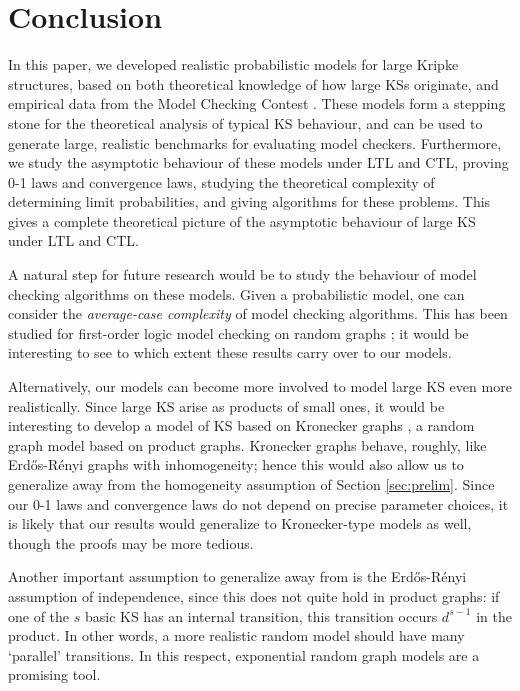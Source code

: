 \documentclass[runngingheads]{llncs}
\begin{document}
\section{Conclusion}

In this paper, we developed realistic probabilistic models for large Kripke structures, based on both theoretical knowledge of how large KSs originate, and empirical data from the Model Checking Contest \cite{amat2023behind}. These models form a stepping stone for the theoretical analysis of typical KS behaviour, and can be used to generate large, realistic benchmarks for evaluating model checkers. Furthermore, we study the asymptotic behaviour of these models under LTL and CTL, proving 0-1 laws and convergence laws, studying the theoretical complexity of determining limit probabilities, and giving algorithms for these problems. This gives a complete theoretical picture of the asymptotic behaviour of large KS under LTL and CTL.

A natural step for future research would be to study the behaviour of model checking algorithms on these models. Given a probabilistic model, one can consider the \emph{average-case complexity} of model checking algorithms. This has been studied for first-order logic model checking on random graphs \cite{dreier2020first}; it would be interesting to see to which extent these results carry over to our models.

Alternatively, our models can become more involved to model large KS even more realistically. Since large KS arise as products of small ones, it would be interesting to develop a model of KS based on Kronecker graphs \cite{leskovec2010kronecker}, a random graph model based on product graphs. Kronecker graphs behave, roughly, like Erd\H{o}s-Rényi graphs with inhomogeneity; hence this would also allow us to generalize away from the homogeneity assumption of Section \ref{sec:prelim}. Since our 0-1 laws and convergence laws do not depend on precise parameter choices, it is likely that our results would generalize to Kronecker-type models as well, though the proofs may be more tedious. 

Another important assumption to generalize away from is the Erd\H{o}s-Rényi assumption of independence, since this does not quite hold in product graphs: if one of the $s$ basic KS has an internal transition, this transition occurs $d^{s-1}$ in the product. In other words, a more realistic random model should have many `parallel' transitions. In this respect, exponential random graph models \cite{snijders2006new} are a promising tool.
\end{document}
